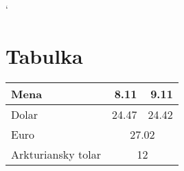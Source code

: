 \documentclass{article}
\begin{document}
\catcode`
\section{Tabulka}
\begin{tabular}{|l|r|r|}
\hline \hline
\rowcolor{yellow}
Mena & 8.11 & 9.11 \\
\hline \hline
Dolar & 24.47 & 24.42 \\
\cline {2-3}
Euro & \multicolumn{2}{c|}{27.02} \\
\cline {2-3}
Arkturiansky tolar & \multicolumn{2}{c|}{12}\\
\hline
\end{tabular}
\end{document}
